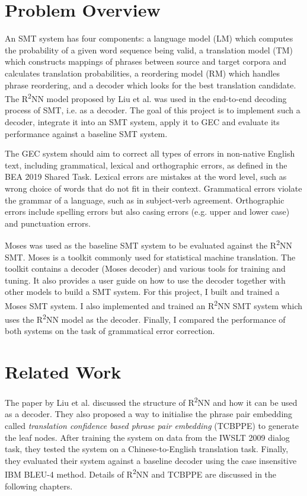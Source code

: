 \documentclass[12pt,a4paper,twoside,openright]{report}
\begin{document}
\section{Problem Overview}

An SMT system has four components: a language model (LM) which computes the probability of a given word sequence being valid, a translation model (TM) which constructs mappings of phrases between source and target corpora and calculates translation probabilities, a reordering model (RM) which handles phrase reordering, and a decoder which looks for the best translation candidate\cite{yuan2017phd}. The R\textsuperscript{2}NN model proposed by Liu et al. was used in the end-to-end decoding process of SMT, i.e. as a decoder. The goal of this project is to implement such a decoder, integrate it into an SMT system, apply it to GEC and evaluate its performance against a baseline SMT system. 

The GEC system should aim to correct all types of errors in non-native English text, including grammatical, lexical and orthographic errors, as defined in the BEA 2019 Shared Task\cite{bryant-etal-2019-bea}. Lexical errors are mistakes at the word level, such as wrong choice of words that do not fit in their context. Grammatical errors violate the grammar of a language, such as in subject-verb agreement. Orthographic errors include spelling errors but also casing errors (e.g. upper and lower case) and punctuation errors.

Moses\cite{moses} was used as the baseline SMT system to be evaluated against the R\textsuperscript{2}NN SMT. Moses is a toolkit commonly used for statistical machine translation. The toolkit contains a decoder (Moses decoder) and various tools for training and tuning. It also provides a user guide on how to use the decoder together with other models to build a SMT system. For this project, I built and trained a Moses SMT system. I also implemented and trained an R\textsuperscript{2}NN SMT system which uses the R\textsuperscript{2}NN model as the decoder. Finally, I compared the performance of both systems on the task of grammatical error correction.

\section{Related Work}

The paper\cite{r2nn} by Liu et al. discussed the structure of R\textsuperscript{2}NN and how it can be used as a decoder.  They also proposed a way to initialise the phrase pair embedding called \textit{translation confidence based phrase pair embedding} (TCBPPE) to generate the leaf nodes. After training the system on data from the IWSLT 2009 dialog task\cite{paul-2009-overview}, they tested the system on a Chinese-to-English translation task. Finally, they evaluated their system against a baseline decoder using the case insensitive IBM BLEU-4 method\cite{10.3115/1073083.1073135}. Details of R\textsuperscript{2}NN and TCBPPE are discussed in the following chapters.
\end{document}
